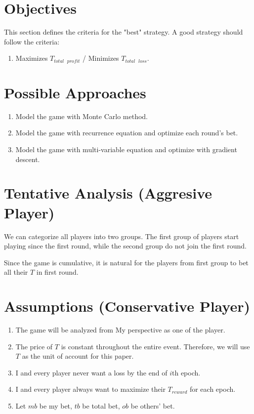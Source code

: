 \documentclass{article}
\begin{document}
\section*{Objectives}
This section defines the criteria for the "best" strategy. 
A good strategy should follow the criteria:
\begin{enumerate}
    \item Maximizes $T_{total \text{ }profit}$ / Minimizes $T_{total \text{ }loss}$. 
\end{enumerate}

\section*{Possible Approaches}
\begin{enumerate}
    \item Model the game with Monte Carlo method.
    \item Model the game with recurrence equation and optimize each round's bet.
    \item Model the game with multi-variable equation and optimize with gradient descent.
\end{enumerate}

\section*{Tentative Analysis (Aggresive Player)}
We can categorize all players into two groups.
The first group of players start playing since the first round, while the second group do not join the first round.

Since the game is cumulative, it is natural for the players from first group to bet all their $T$ in first round. 

\section*{Assumptions (Conservative Player)}
\begin{enumerate}
    \item The game will be analyzed from My perspective as one of the player.
    
    \item The price of $T$ is constant throughout the entire event. 
    Therefore, we will use $T$ as the unit of account for this paper.

    \item I and every player never want a loss by the end of $i$th epoch.
    
    \item I and every player always want to maximize their $T_{reward}$ for each epoch.
    
    \item Let $mb$ be my bet, $tb$ be total bet, $ob$ be others' bet.
\end{enumerate}
\end{document}
